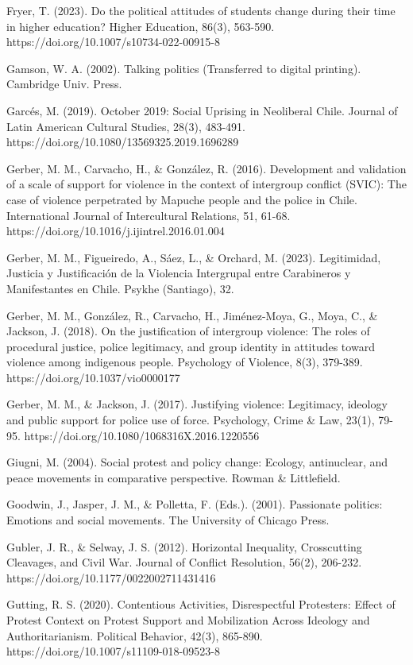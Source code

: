 \documentclass[
  13pt,
]{article}
\begin{document}
Fryer, T. (2023). Do the political attitudes of students change during
their time in higher education? Higher Education, 86(3), 563-590.
https://doi.org/10.1007/s10734-022-00915-8

Gamson, W. A. (2002). Talking politics (Transferred to digital
printing). Cambridge Univ. Press.

Garcés, M. (2019). October 2019: Social Uprising in Neoliberal Chile.
Journal of Latin American Cultural Studies, 28(3), 483-491.
https://doi.org/10.1080/13569325.2019.1696289

Gerber, M. M., Carvacho, H., \& González, R. (2016). Development and
validation of a scale of support for violence in the context of
intergroup conflict (SVIC): The case of violence perpetrated by Mapuche
people and the police in Chile. International Journal of Intercultural
Relations, 51, 61-68. https://doi.org/10.1016/j.ijintrel.2016.01.004

Gerber, M. M., Figueiredo, A., Sáez, L., \& Orchard, M. (2023).
Legitimidad, Justicia y Justificación de la Violencia Intergrupal entre
Carabineros y Manifestantes en Chile. Psykhe (Santiago), 32.

Gerber, M. M., González, R., Carvacho, H., Jiménez-Moya, G., Moya, C.,
\& Jackson, J. (2018). On the justification of intergroup violence: The
roles of procedural justice, police legitimacy, and group identity in
attitudes toward violence among indigenous people. Psychology of
Violence, 8(3), 379-389. https://doi.org/10.1037/vio0000177

Gerber, M. M., \& Jackson, J. (2017). Justifying violence: Legitimacy,
ideology and public support for police use of force. Psychology, Crime
\& Law, 23(1), 79-95. https://doi.org/10.1080/1068316X.2016.1220556

Giugni, M. (2004). Social protest and policy change: Ecology,
antinuclear, and peace movements in comparative perspective. Rowman \&
Littlefield.

Goodwin, J., Jasper, J. M., \& Polletta, F. (Eds.). (2001). Passionate
politics: Emotions and social movements. The University of Chicago
Press.

Gubler, J. R., \& Selway, J. S. (2012). Horizontal Inequality,
Crosscutting Cleavages, and Civil War. Journal of Conflict Resolution,
56(2), 206-232. https://doi.org/10.1177/0022002711431416

Gutting, R. S. (2020). Contentious Activities, Disrespectful Protesters:
Effect of Protest Context on Protest Support and Mobilization Across
Ideology and Authoritarianism. Political Behavior, 42(3), 865-890.
https://doi.org/10.1007/s11109-018-09523-8
\end{document}
